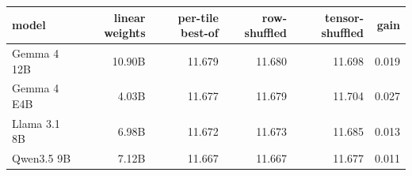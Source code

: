 \begin{tabular}{lrrrrr}
\toprule
model & linear weights & per-tile best-of & row-shuffled & tensor-shuffled & gain \\
\midrule
Gemma 4 12B & 10.90B & 11.679 & 11.680 & 11.698 & 0.019 \\
Gemma 4 E4B & 4.03B & 11.677 & 11.679 & 11.704 & 0.027 \\
Llama 3.1 8B & 6.98B & 11.672 & 11.673 & 11.685 & 0.013 \\
Qwen3.5 9B & 7.12B & 11.667 & 11.667 & 11.677 & 0.011 \\
\bottomrule
\end{tabular}
